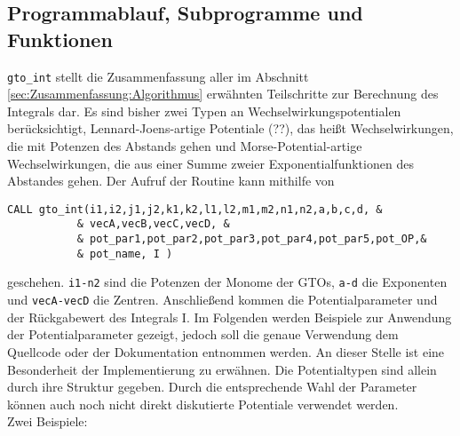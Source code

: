 \subsection{Programmablauf, Subprogramme und Funktionen}
%
\texttt{gto\_int} stellt die Zusammenfassung aller im Abschnitt 
\ref{sec:Zusammenfassung:Algorithmus} erwähnten Teilschritte zur 
Berechnung des 
Integrals dar. Es sind bisher zwei Typen an 
Wechselwirkungspotentialen 
berücksichtigt, Lennard-Joens-artige Potentiale (??), das heißt 
Wechselwirkungen, 
die mit 
Potenzen des Abstands gehen und Morse-Potential-artige Wechselwirkungen, die 
aus einer Summe zweier Exponentialfunktionen des Abstandes gehen. Der Aufruf 
der Routine kann mithilfe von
%
\begin{lstlisting}
CALL gto_int(i1,i2,j1,j2,k1,k2,l1,l2,m1,m2,n1,n2,a,b,c,d, &
           & vecA,vecB,vecC,vecD, & 
           & pot_par1,pot_par2,pot_par3,pot_par4,pot_par5,pot_OP,&
           & pot_name, I )
\end{lstlisting}
%
geschehen. \texttt{i1-n2} sind die Potenzen der Monome der GTOs, \texttt{a-d} 
die 
Exponenten und 
\texttt{vecA-vecD} die Zentren. Anschließend kommen die Potentialparameter und 
der Rückgabewert des Integrals I. Im Folgenden werden Beispiele zur Anwendung 
der Potentialparameter gezeigt, jedoch soll die genaue Verwendung dem 
Quellcode oder der Dokumentation entnommen werden. An dieser Stelle 
ist eine 
Besonderheit der Implementierung zu erwähnen. Die Potentialtypen sind 
allein 
durch ihre Struktur gegeben. Durch die entsprechende Wahl der Parameter 
können auch 
noch nicht direkt diskutierte Potentiale verwendet werden. \\ Zwei Beispiele:
%
